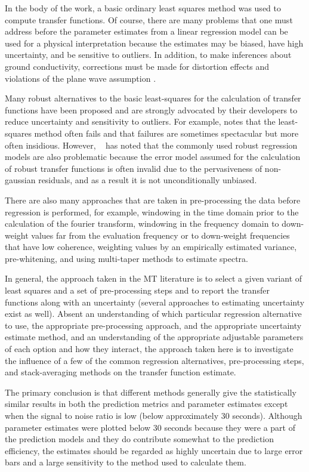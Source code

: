 \documentclass[draft,linenumbers]{agujournal2018}
\begin{document}
In the body of the work, a basic ordinary least squares method was used to compute transfer functions. Of course, there are many problems that one must address before the parameter estimates from a linear regression model can be used for a physical interpretation because the estimates may be biased, have high uncertainty, and be sensitive to outliers. In addition, to make inferences about ground conductivity, corrections must be made for distortion effects and violations of the plane wave assumption \citep{Simpson2005}.

Many robust alternatives to the basic least-squares for the calculation of transfer functions have been proposed and are strongly advocated by their developers to reduce uncertainty and sensitivity to outliers. For example, \cite{Egbert2011} notes that the least-squares method often fails and \cite{Chave1987} that failures are sometimes spectacular but more often insidious. However, ~\cite{Chave2017} has noted that the commonly used robust regression models are also problematic because the error model assumed for the calculation of robust transfer functions is often invalid due to the pervasiveness of non-gaussian residuals, and as a result it is not unconditionally unbiased.

There are also many approaches that are taken in pre-processing the data before regression is performed, for example, windowing in the time domain prior to the calculation of the fourier transform, windowing in the frequency domain to down-weight values far from the evaluation frequency or to down-weight frequencies that have low coherence, weighting values by an empirically estimated variance, pre-whitening, and using multi-taper methods to estimate spectra.

In general, the approach taken in the MT literature is to select a given variant of least squares and a set of pre-processing steps and to report the transfer functions along with an uncertainty (several approaches to estimating uncertainty exist as well). Absent an understanding of which particular regression alternative to use, the appropriate pre-processing approach, and the appropriate uncertainty estimate method, and an understanding of the appropriate adjustable parameters of each option and how they interact, the approach taken here is to investigate the influence of a few of the common regression alternatives, pre-processing steps, and stack-averaging methods on the transfer function estimate. 

The primary conclusion is that different methods generally give the statistically similar results in both the prediction metrics and parameter estimates except when the signal to noise ratio is low (below approximately $30$ seconds). Although parameter estimates were plotted below $30$ seconds because they were a part of the prediction models and they do contribute somewhat to the prediction efficiency, the estimates should be regarded as highly uncertain due to large error bars and a large sensitivity to the method used to calculate them.
\end{document}
